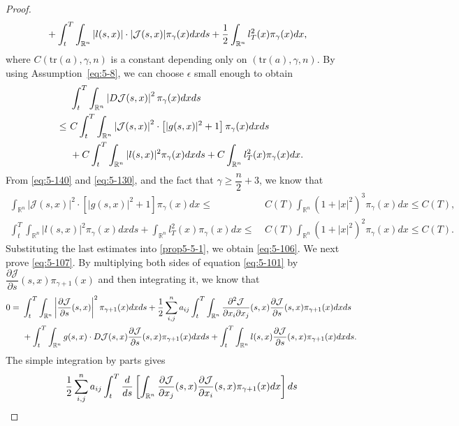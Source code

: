 \documentclass[11pt]{article}
\numberwithin{equation}{section}
\newcommand{\brn}{{\mathbb{R}^n}}
\newcommand{\1}{\mbox{1\hspace{-1mm}I}}
\begin{document}
\begin{proof}
\begin{align}
    &+\int_{t}^{T}\int_{\brn} |l(s,x)|\cdot |\mathcal{J}(s,x)|\pi_{\gamma}(x)dxds +\dfrac{1}{2}\int_{\brn}l_{T}^{2}(x)\pi_{\gamma}(x)dx, \notag 
\end{align}
where $C(\text{tr}(a),\gamma,n)$ is a constant depending only on $(\text{tr}(a),\gamma,n)$. By using Assumption~\ref{eq:5-8}, we can choose $\epsilon$ small enough to obtain
\begin{align}
    &\int_{t}^{T}\int_{\brn}\left|D\mathcal{J}(s,x)\right|^2 \pi_{\gamma}(x) dxds \notag \\
    \le\ & C\int_{t}^{T}\int_{\brn} \left|\mathcal{J}(s,x)\right|^2\cdot\left[ |g(s,x)|^2 + 1  \right]\pi_{\gamma}(x) dxds \notag \\
    &+C\int_{t}^{T}\int_{\brn} |l(s,x)|^2\pi_{\gamma}(x)dxds +C\int_{\brn}l_{T}^{2}(x)\pi_{\gamma}(x)dx. \label{prop5-5-1}
\end{align}
From \eqref{eq:5-140} and \eqref{eq:5-130}, and the fact that $\gamma\geq\dfrac{n}{2}+3$, we know that
\begin{align*}
    \int_{\brn}\left|\mathcal{J}(s,x)\right|^2\cdot\left[ |g(s,x)|^2 + 1  \right]\pi_{\gamma}(x)dx \le\ &  C(T) \int_{\brn}\left(1+|x|^{2}\right)^{3}\pi_{\gamma}(x)dx\le C(T),\\
    \int_{t}^{T}\int_{\brn} |l(s,x)|^2\pi_{\gamma}(x)dxds +\int_{\brn}l_{T}^{2}(x)\pi_{\gamma}(x)dx \le\ & C(T) \int_{\brn}\left(1+|x|^{2}\right)^{2}\pi_{\gamma}(x)dx\le C(T).
\end{align*}
Substituting the last estimates into \eqref{prop5-5-1}, we obtain \eqref{eq:5-106}. We next prove \eqref{eq:5-107}. By multiplying both sides of equation \eqref{eq:5-101} by $\dfrac{\partial\mathcal{J}}{\partial s}(s,x)\pi_{\gamma+1}(x)$ and then integrating it, we know that
\begin{align}
    0=\ & \int_{t}^{T}\int_{\brn}\left|\dfrac{\partial\mathcal{J}}{\partial s}(s,x)\right|^{2}\pi_{\gamma+1}(x)dxds+\dfrac{1}{2}\sum_{i,j}^n a_{ij}\int_{t}^{T}\int_{\brn}\dfrac{\partial^{2}\mathcal{J}}{\partial x_{i}\partial x_{j}}(s,x)\dfrac{\partial\mathcal{J}}{\partial s}(s,x)\pi_{\gamma+1}(x)dxds \notag \\
    &+\int_{t}^{T}\int_{\brn}g(s,x)\cdot D\mathcal{J}(s,x)\dfrac{\partial\mathcal{J}}{\partial s}(s,x)\pi_{\gamma+1}(x)dxds+\int_{t}^{T}\int_{\brn}l(s,x)\dfrac{\partial\mathcal{J}}{\partial s}(s,x)\pi_{\gamma+1}(x)dxds. \label{prop5-5-2}
\end{align}
The simple integration by parts gives
\begin{align}
    &\dfrac{1}{2}\sum_{i,j}^n a_{ij}\int_{t}^{T}\frac{d}{ds}\left[\int_{\brn} \dfrac{\partial\mathcal{J}}{\partial x_{j}}(s,x)\dfrac{\partial\mathcal{J}}{\partial x_i}(s,x)\pi_{\gamma+1}(x)dx\right]ds \notag \\

\end{align}
\end{proof}
\end{document}
